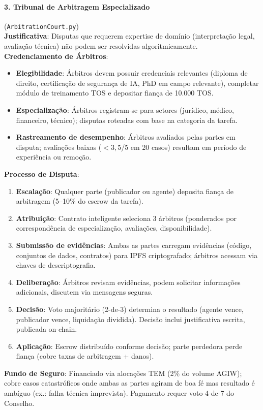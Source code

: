 \documentclass[11pt]{article}
\begin{document}
\paragraph{3. Tribunal de Arbitragem Especializado} (\texttt{ArbitrationCourt.py})\\
\textbf{Justificativa}: Disputas que requerem expertise de domínio (interpretação legal, avaliação técnica) não podem ser resolvidas algoritmicamente.\\
\textbf{Credenciamento de Árbitros}:
\begin{itemize}[noitemsep]
  \item \textbf{Elegibilidade}: Árbitros devem possuir credenciais relevantes (diploma de direito, certificação de segurança de IA, PhD em campo relevante), completar módulo de treinamento TOS e depositar fiança de 10.000 TOS.
  \item \textbf{Especialização}: Árbitros registram-se para setores (jurídico, médico, financeiro, técnico); disputas roteadas com base na categoria da tarefa.
  \item \textbf{Rastreamento de desempenho}: Árbitros avaliados pelas partes em disputa; avaliações baixas ($<3,5$/5 em 20 casos) resultam em período de experiência ou remoção.
\end{itemize}
\textbf{Processo de Disputa}:
\begin{enumerate}[noitemsep]
  \item \textbf{Escalação}: Qualquer parte (publicador ou agente) deposita fiança de arbitragem (5--10\% do escrow da tarefa).
  \item \textbf{Atribuição}: Contrato inteligente seleciona 3 árbitros (ponderados por correspondência de especialização, avaliações, disponibilidade).
  \item \textbf{Submissão de evidências}: Ambas as partes carregam evidências (código, conjuntos de dados, contratos) para IPFS criptografado; árbitros acessam via chaves de descriptografia.
  \item \textbf{Deliberação}: Árbitros revisam evidências, podem solicitar informações adicionais, discutem via mensagens seguras.
  \item \textbf{Decisão}: Voto majoritário (2-de-3) determina o resultado (agente vence, publicador vence, liquidação dividida). Decisão inclui justificativa escrita, publicada on-chain.
  \item \textbf{Aplicação}: Escrow distribuído conforme decisão; parte perdedora perde fiança (cobre taxas de arbitragem + danos).
\end{enumerate}
\textbf{Fundo de Seguro}: Financiado via alocações TEM (2\% do volume AGIW); cobre casos catastróficos onde ambas as partes agiram de boa fé mas resultado é ambíguo (ex.: falha técnica imprevista). Pagamento requer voto 4-de-7 do Conselho.
\end{document}
